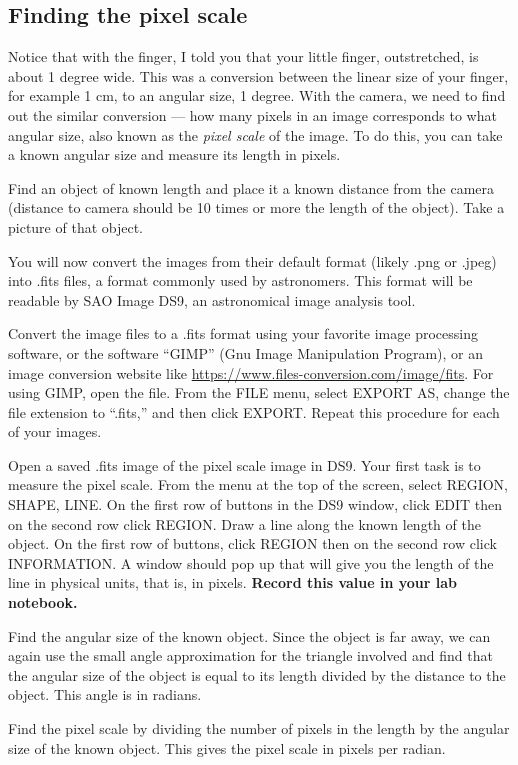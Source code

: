 \subsection{Finding the pixel scale}

Notice that with the finger, I told you that your little finger, outstretched, is about 1 degree wide. This was a conversion between the linear size of your finger, for example 1 cm, to an angular size, 1 degree. With the camera, we need to find out the similar conversion --- how many pixels in an image corresponds to what angular size, also known as the \textit{pixel scale} of the image. To do this, you can take a known angular size and measure its length in pixels.
\begin{steps}
	\item Find an object of known length and place it a known distance from the camera (distance to camera should be 10 times or more the length of the object). Take a picture of that object.
\end{steps}

You will now convert the images from their default format (likely .png or .jpeg) into .fits
files, a format commonly used by astronomers. This format will be readable by SAO
Image DS9, an astronomical image analysis tool.
\begin{steps}
	\item Convert the image files to a .fits format using your favorite image processing software, or the software ``GIMP'' (Gnu Image Manipulation Program), or an image conversion website like \url{https://www.files-conversion.com/image/fits}. For using GIMP, open the file. From the FILE menu, select EXPORT AS, change the
file extension to “.fits,” and then click EXPORT. Repeat this procedure for each of your
images.

\item Open a saved .fits image of the pixel scale image in DS9. Your first task is to measure the pixel scale.
From the menu at the top of the screen, select REGION, SHAPE, LINE. On the first row
of buttons in the DS9 window, click EDIT then on the second row click REGION. Draw
a line along the known length of the object. On the first row of buttons, click REGION then on the
second row click INFORMATION. A window should pop up that will give you the length
of the line in physical units, that is, in pixels. \textbf{Record this value in your lab notebook.}

\item Find the angular size of the known object. Since the object is far away, we can again use the small angle approximation for the triangle involved and find that the angular size of the object is equal to its length divided by the distance to the object. This angle is in radians.

\item Find the pixel scale by dividing the number of pixels in the length by the angular size of the known object. This gives the pixel scale in pixels per radian.

\end{steps}
